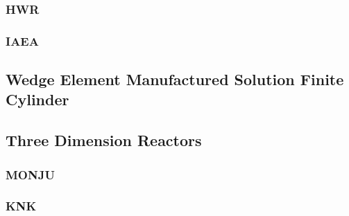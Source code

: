     \subsubsection{HWR}
    \subsubsection{IAEA}
  \subsection{Wedge Element Manufactured Solution Finite Cylinder}
  \subsection{Three Dimension Reactors}
    \subsubsection{MONJU}
    \subsubsection{KNK}
